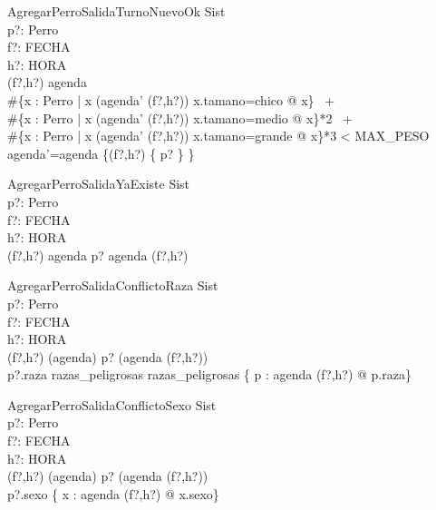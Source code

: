 \begin{schema}{AgregarPerroSalidaTurnoNuevoOk}
\Delta Sist \\
p?: Perro \\
f?: FECHA \\
h?: HORA \\
\where
(f?,h?) \notin \dom agenda \\
\#\{x : Perro | x \in (agenda' (f?,h?)) \land x.tamano=chico @ x\} \ + \\
\#\{x : Perro | x \in (agenda' (f?,h?)) \land  x.tamano=medio @ x\}*2 \ + \\
\#\{x : Perro | x \in (agenda' (f?,h?)) \land  x.tamano=grande @ x\}*3 < MAX\_PESO \\
agenda'=agenda \oplus \{(f?,h?) \mapsto \{ p? \} \} \\
\end{schema}

\begin{schema}{AgregarPerroSalidaYaExiste}
\Xi Sist \\
p?: Perro \\
f?: FECHA \\
h?: HORA \\
\where
(f?,h?) \in \dom agenda \land p? \in agenda (f?,h?) \\
\end{schema}

\begin{schema}{AgregarPerroSalidaConflictoRaza}
\Xi Sist \\
p?: Perro \\
f?: FECHA \\
h?: HORA \\
\where
(f?,h?) \in (\dom agenda) \land p? \notin (agenda (f?,h?)) \\
p?.raza \in razas\_peligrosas \land razas\_peligrosas \cap \{ p : agenda (f?,h?) @ p.raza\} \neq \emptyset \\
\end{schema}

\begin{schema}{AgregarPerroSalidaConflictoSexo}
\Xi Sist \\
p?: Perro \\
f?: FECHA \\
h?: HORA \\
\where
(f?,h?) \in (\dom agenda) \land p? \notin (agenda (f?,h?)) \\
p?.sexo \notin \{ x : agenda (f?,h?) @ x.sexo\}
\end{schema}

